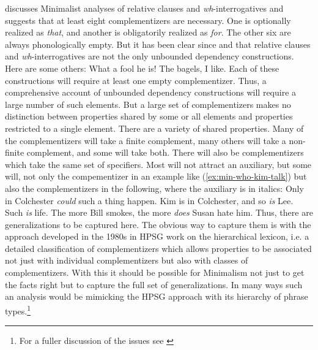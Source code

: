 \documentclass[output=paper]{langsci/langscibook}
\begin{document}
\citet{Borsley2006a,Borsley.2017} discusses Minimalist analyses of relative clauses and \textit{wh}-interrogatives and suggests that at least eight complementizers are necessary. One is optionally realized as \textit{that}, and another is obligatorily realized as \textit{for}. The other six are always phonologically empty. But it has been clear since \citet{Ross67} and \citet{Chomsky.1977} that relative clauses and \textit{wh}-interrogatives are not the only unbounded dependency constructions. Here are some others:
\eal
\settowidth{}
\ex What a fool he is!                          
\ex The bagels, I like.	                        
\zl 
Each of these constructions will require at least one empty complementizer. Thus, a comprehensive account of unbounded dependency constructions will require a large number of such elements. But a large set of complementizers makes no distinction between properties shared by some or all elements and properties restricted to a single element. There are a variety of shared properties. Many of the complementizers will take a finite complement, many others will take a non-finite complement, and some will take both. There will also be complementizers which take the same set of specifiers. Most will not attract an auxiliary, but some will, not only the compementizer in an example like (\ref{ex:min-who-kim-talk}) but also the complementizers in the following, where the auxiliary is in italics:
\eal
\ex Only in Colchester \textit{could} such a thing happen.
\ex Kim is in Colchester, and so \textit{is} Lee.
\ex Such \textit{is} life.
\ex The more Bill smokes, the more \textit{does} Susan hate him.
\zl
Thus, there are generalizations to be captured here. The obvious way to capture them is with the approach developed in the 1980s in HPSG work on the hierarchical lexicon, i.e. a detailed classification of complementizers which allows properties to be associated not just with individual complementizers but also with classes of complementizers. With this it should be possible for Minimalism not just to get the facts right but to capture the full set of generalizations. In many ways such an analysis would be mimicking the HPSG approach with its hierarchy of phrase types.\footnote{%
For a fuller discussion of the issues see \citet{Borsley2006a,Borsley.2017}%
}	
\end{document}
